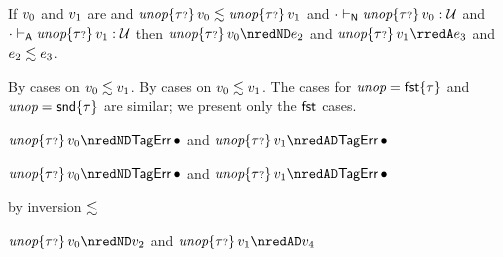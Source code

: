 \begin{lemma}\label{HA-D-unop}
  If\/ $v_0$ and\/ $v_1$ are \reducedsurfaceexpressions{}
  and\/ $\textit{unop}{\{{\tau{\scriptstyle ?}}\}}\,v_0 \lesssim \textit{unop}{\{{\tau{\scriptstyle ?}}\}}\,v_1$
  and\/ ${\cdot} \vdash_{\mathsf{N}} {\textit{unop}{\{{\tau{\scriptstyle ?}}\}}\,v_0} : {\mathcal U}$
  and\/ ${\cdot} \vdash_{\mathsf{A}} {\textit{unop}{\{{\tau{\scriptstyle ?}}\}}\,v_1} : {\mathcal U}$
  then\/ $\eunopt{\stoptional}{\svalue_0} \nredND \sexpr_2$
  and\/ $\eunopt{\stoptional}{\svalue_1} \rredA \sexpr_3$
  and\/ $e_2 \lesssim e_3$.
\end{lemma}{
  \newcommand{\shortpf}{By cases on $\rexpr{\svalue_0}{\svalue_1}$.}
\begin{lamportproof*}
  \shortpf
\mainproof
  \shortpf
  The cases for $\textit{unop} = \mathsf{fst}{\{\tau\}}$ and $\textit{unop} = \mathsf{snd}{\{\tau\}}$ are similar; we present only the $\mathsf{fst}$ cases.

    \begin{pfproof}
      \qedstep
        \begin{pfproof}
          {$\eunopt{\stoptional}{\svalue_0} \nredND \tagerrorD$}
          and
          {$\eunopt{\stoptional}{\svalue_1} \nredAD \tagerrorD$}
        \end{pfproof}
    \end{pfproof}

    \begin{pfproof}
      \qedstep
        \begin{pfproof}
          {$\eunopt{\stoptional}{\svalue_0} \nredND \tagerrorD$}
          and
          {$\eunopt{\stoptional}{\svalue_1} \nredAD \tagerrorD$}
        \end{pfproof}
    \end{pfproof}

    \begin{pfproof}
        \begin{pfproof}
          by inversion $\lesssim$
        \end{pfproof}
      \qedstep
        \begin{pfproof}
          {$\eunopt{\stoptional}{\svalue_0} \nredND \svalue_2$}
          and
          {$\eunopt{\stoptional}{\svalue_1} \nredAD \svalue_4$}
        \end{pfproof}
    \end{pfproof}


\end{lamportproof*}}
